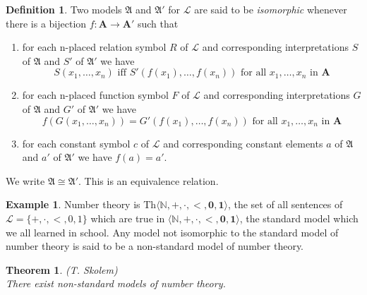 \documentclass[titlepage, oneside]{amsbook}
\theoremstyle{plain}
\newtheorem{theorem}{Theorem}
\theoremstyle{definition}
\newtheorem{examples}{Example}
\newtheorem{definition}{Definition}
\theoremstyle{remark}
\newcommand{\xnot}[2][0]{\ensuremath{ x_{#1} , \dots , x_{#2}}}
\begin{document}

\begin{definition}
%
 Two models $\mathfrak{A} $ and
$\mathfrak{A}'$ for 
$\mathcal{L}$ are said to be \emph{isomorphic} whenever there is a
bijection $f: \mathbf{A} \to \mathbf{A}'$ such that 

\begin{enumerate}
\item for each n-placed relation symbol $R$ of $\mathcal{L}$ and 
corresponding interpretations $S$ of $\mathfrak{A}$ and $S'$ of 
$\mathfrak{A}'$ we have \[ S(x_{1} , \dots ,x_{n}) \mbox{ iff } 
S'(f(x_{1}), \dots ,f(x_{n})) \mbox{ for all } \xnot[1]{n} \mbox{ in } 
\mathbf{A} \]


\item for each n-placed function symbol $F$ of $\mathcal{L}$ and 
corresponding interpretations $G$ of $\mathfrak{A}$ and $G'$ of 
$\mathfrak{A}'$ we have \[ f(G(x_{1} , \dots ,x_{n})) = 
G'(f(x_{1}), \dots ,f(x_{n})) \mbox{ for all } \xnot[1]{n} \mbox{ in } 
\mathbf{A} \]



\item for each constant symbol $c$ of $\mathcal{L}$ and corresponding 
constant elements $a$ of $\mathfrak{A}$ and $a'$ of $\mathfrak{A}'$ we 
have $f(a)=a'$.

\end{enumerate}
We write $\mathfrak{A} \cong \mathfrak{A}'$. This is an equivalence relation.

\end{definition}

\begin{examples}\label{X:standard}
%
%
 Number theory is Th$\langle \mathbb{N}, \pmb{+} , 
\pmb{\cdot} , \pmb{< }, \pmb{0} ,\pmb{ 1} \rangle$,  the set of all
sentences of $\mathcal{L} = \{ + , \cdot , < , 0 , 1 \}$
which are true in
 $\langle \mathbb{N},\pmb{ +}, 
\pmb{\cdot} , \pmb{<} ,\pmb{ 0}, \pmb{1} \rangle$,  the standard model
which we all learned in
school. Any model not isomorphic to the standard model of number theory is said to be a non-standard model of number theory.
\end{examples}

\begin{theorem}\label{T:nonstd} (T. Skolem) \\
%
%
 There exist non-standard
models of 
number theory.
\end{theorem}
\end{document}
